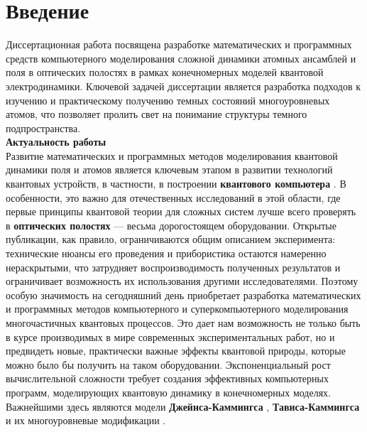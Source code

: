 \chapter*{Введение}                         %

\newcommand{\actuality}{}
\newcommand{\progress}{}
\newcommand{\aim}{{\textbf\aimTXT}}
\newcommand{\tasks}{\textbf{\tasksTXT}}
\newcommand{\novelty}{\textbf{\noveltyTXT}}
\newcommand{\influence}{\textbf{\influenceTXT}}
\newcommand{\contribution}{\textbf{\contributionTXT}}
\newcommand{\publications}{\textbf{\publicationsTXT}}

Диссертационная работа посвящена разработке математических и про­граммных средств компьютерного моделирования сложной динамики атомных ансамблей и поля в оптических полостях в рамках конечномерных моделей квантовой электродинамики. Ключевой задачей диссертации является разра­ботка подходов к изучению и практическому получению темных состояний многоуровневых атомов, что позволяет пролить свет на понимание структуры темного подпространства.
\\[24pt]
\indent\textbf{Актуальность работы}\\
\indent Развитие математических и программных методов моделирования кванто­вой динамики поля и атомов является ключевым этапом в развитии технологий квантовых устройств, в частности, в построении \textbf{квантового компьютера} \cite{feynman,quantum_computing_zalka,valiev_1,valiev_2}. В особенности, это важно для отечественных исследований в этой об­ласти, где первые принципы квантовой теории для сложных систем лучше всего проверять в \textbf{оптических полостях} \cite{cavity_exp_1,cavity_exp_2,cavity_exp_3} --- весьма дорогостоящем оборудовании. Открытые публикации, как правило, ограничиваются общим описанием эксперимента: технические нюансы его проведения и прибористика остают­ся намеренно нераскрытыми, что затрудняет воспроизводимость полученных результатов и ограничивает возможность их использования другими иссле­дователями. Поэтому особую значимость на сегодняшний день приобретает разработка математических и программных методов компьютерного и супер­компьютерного моделирования многочастичных квантовых процессов. Это дает нам возможность не только быть в курсе производимых в мире современных экс­периментальных работ, но и предвидеть новые, практически важные эффекты квантовой природы, которые можно было бы получить на таком оборудова­нии. Экспоненциальный рост вычислительной сложности \cite{feynman} требует создания эффективных компьютерных программ, моделирующих квантовую динамику в конечномерных моделях. Важнейшими здесь являются модели \textbf{Джейнса-Кам­мингса} \cite{jc_comparison,jc_qudit,jc_ladder,jc_descendants,jc_phase_transition}, \textbf{Тависа-Каммингса} \cite{tc_exact_solution,tc_a_study,tc_dicke_2,tc_improvement,tc_experimental} и их многоуровневые модификации \cite{jc_tc_extension_1,jc_tc_extension_2,jc_tc_extension_3}.

